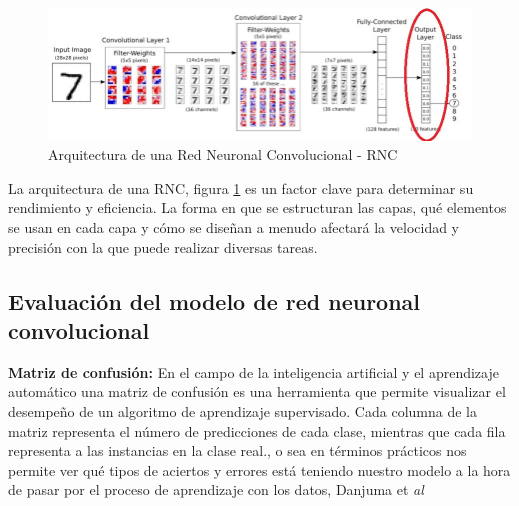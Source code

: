 \begin{figure}[H]
    \centering
    \includegraphics[width=1\linewidth]{imagenes/red_cov_digito_7.jpg}
    \caption{Arquitectura de una Red Neuronal Convolucional - RNC}
    \label{fig:red_cov_digito_7}
\end{figure}

La arquitectura de una RNC, figura \ref{fig:red_cov_digito_7} es un factor clave para determinar su rendimiento y eficiencia. La forma en que se estructuran las capas, qué elementos se usan en cada capa y cómo se diseñan a menudo afectará la velocidad y precisión con la que puede realizar diversas tareas.\\

\subsection{Evaluación del modelo de red neuronal convolucional}

\item \textbf{Matriz de confusión:} En el campo de la inteligencia artificial  y el aprendizaje automático una matriz de confusión es una herramienta que permite visualizar el desempeño de un algoritmo  de aprendizaje supervisado. Cada columna de la matriz representa el número de predicciones de cada clase, mientras que cada fila representa a las instancias en la clase real., o sea en términos prácticos nos permite ver  qué tipos de aciertos y errores está teniendo nuestro modelo a la hora de pasar por el proceso de aprendizaje con los datos, Danjuma et \textit{al} \cite{danjuma2015performance}

